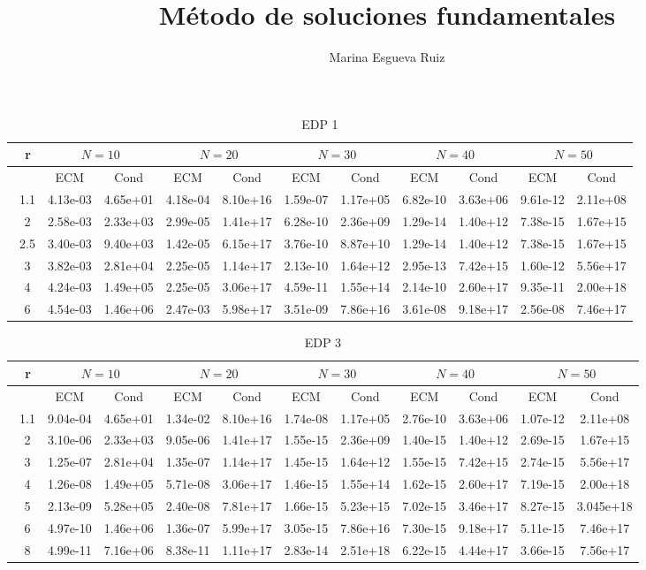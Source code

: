 \documentclass[11pt,a4paper]{article}
\author{Marina Esgueva Ruiz}
\title{Método de soluciones fundamentales}
\begin{document}
\begin{landscape}
\begin{table}
\caption{EDP 1}
\centering
\begin{tabular}{|c|cc|cc|cc|cc|cc|}
\hline
\ r &\multicolumn{2}{|c|}{$N=10$} &\multicolumn{2}{|c|}{$N=20$}& \multicolumn{2}{|c|}{$N=30$}& \multicolumn{2}{|c|}{$N=40$} & \multicolumn{2}{|c|}{$N=50$} \\
\hline
\   & ECM & Cond & ECM & Cond & ECM & Cond & ECM & Cond & ECM & Cond \\
\hline
\ 1.1 & 4.13e-03 &  4.65e+01 & 4.18e-04 & 8.10e+16 & 1.59e-07& 1.17e+05 & 6.82e-10& 3.63e+06 & 9.61e-12& 2.11e+08 \\
\ 2 & 2.58e-03 & 2.33e+03 &  2.99e-05& 1.41e+17& 6.28e-10 & 2.36e+09 & 1.29e-14 & 1.40e+12& 7.38e-15 & 1.67e+15 \\
\ 2.5 & 3.40e-03& 9.40e+03 & 1.42e-05 & 6.15e+17 & 3.76e-10 &  8.87e+10 & 1.29e-14& 1.40e+12 & 7.38e-15 & 1.67e+15\\
\ 3 & 3.82e-03 & 2.81e+04 & 2.25e-05 & 1.14e+17 & 2.13e-10 & 1.64e+12 & 2.95e-13 & 7.42e+15 & 1.60e-12 & 5.56e+17\\
\ 4 & 4.24e-03& 1.49e+05 & 2.25e-05& 3.06e+17 & 4.59e-11 & 1.55e+14 & 2.14e-10& 2.60e+17 & 9.35e-11 & 2.00e+18 \\
\ 6 & 4.54e-03 & 1.46e+06 & 2.47e-03& 5.98e+17& 3.51e-09& 7.86e+16 & 3.61e-08 & 9.18e+17& 2.56e-08 & 7.46e+17\\
\hline
\end{tabular}
\end{table}


\begin{table}
\caption{EDP 3}
\centering
\begin{tabular}{|c|cc|cc|cc|cc|cc|}
\hline
\ r &\multicolumn{2}{|c|}{$N=10$} &\multicolumn{2}{|c|}{$N=20$}& \multicolumn{2}{|c|}{$N=30$}& \multicolumn{2}{|c|}{$N=40$} & \multicolumn{2}{|c|}{$N=50$} \\
\hline
\   & ECM & Cond & ECM & Cond & ECM & Cond & ECM & Cond & ECM & Cond \\
\hline
\ 1.1 & 9.04e-04 &  4.65e+01 & 1.34e-02 & 8.10e+16 & 1.74e-08 & 1.17e+05 & 2.76e-10 &  3.63e+06 & 1.07e-12& 2.11e+08\\
\ 2 & 3.10e-06 & 2.33e+03 & 9.05e-06 & 1.41e+17 & 1.55e-15 & 2.36e+09 & 1.40e-15 & 1.40e+12 & 2.69e-15 & 1.67e+15\\
\ 3 &  1.25e-07 & 2.81e+04 & 1.35e-07 & 1.14e+17 & 1.45e-15 & 1.64e+12 & 1.55e-15& 7.42e+15 & 2.74e-15 & 5.56e+17\\
\ 4 & 1.26e-08 & 1.49e+05 & 5.71e-08 & 3.06e+17 & 1.46e-15 & 1.55e+14 & 1.62e-15 & 2.60e+17 & 7.19e-15 & 2.00e+18\\
\ 5 & 2.13e-09 & 5.28e+05 & 2.40e-08 & 7.81e+17 & 1.66e-15 & 5.23e+15 & 7.02e-15 & 3.46e+17 & 8.27e-15 & 3.045e+18\\
\ 6 & 4.97e-10 & 1.46e+06 & 1.36e-07 & 5.99e+17 & 3.05e-15 &  7.86e+16 & 7.30e-15 & 9.18e+17 & 5.11e-15 & 7.46e+17\\
\ 8 & 4.99e-11 & 7.16e+06 & 8.38e-11 & 1.11e+17 & 2.83e-14 & 2.51e+18 &  6.22e-15 & 4.44e+17 & 3.66e-15 &  7.56e+17\\


\end{tabular}
\end{table}
\end{landscape}
\end{document}
